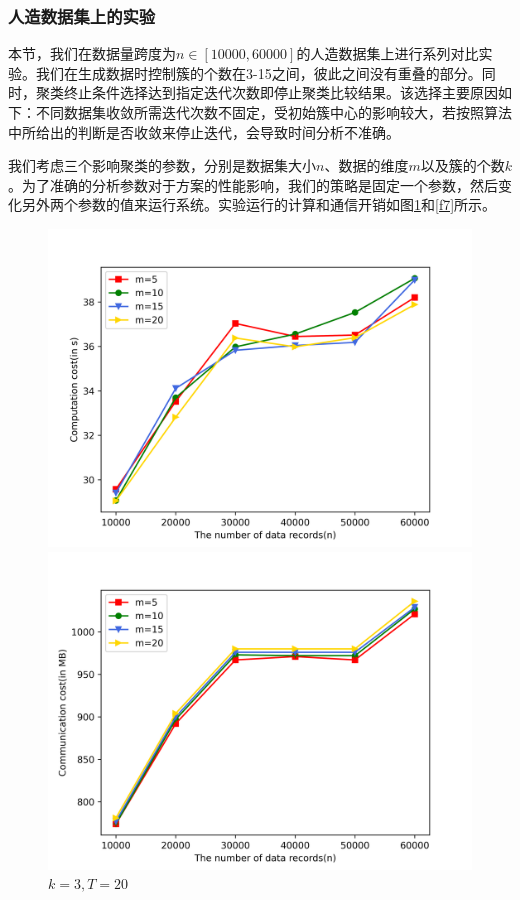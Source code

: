 \subsubsection{人造数据集上的实验}
本节，我们在数据量跨度为$ n\in[10000,60000] $的人造数据集上进行系列对比实验。我们在生成数据时控制簇的个数在3-15之间，彼此之间没有重叠的部分。同时，聚类终止条件选择达到指定迭代次数即停止聚类比较结果。该选择主要原因如下：不同数据集收敛所需迭代次数不固定，受初始簇中心的影响较大，若按照算法中所给出的判断是否收敛来停止迭代，会导致时间分析不准确。

我们考虑三个影响聚类的参数，分别是数据集大小$ n $、数据的维度$ m $以及簇的个数$ k $。为了准确的分析参数对于方案的性能影响，我们的策略是固定一个参数，然后变化另外两个参数的值来运行系统。实验运行的计算和通信开销如图\ref{f6}和\ref{f7}所示。
\begin{figure}[htbp] %
	\captionsetup{font=scriptsize}
	\begin{minipage}[t]{0.45\linewidth}
		\includegraphics[width=\linewidth]{img/m.png}
	\end{minipage}%
	\hfill%
	\begin{minipage}[t]{0.45\linewidth}
		\includegraphics[width=\linewidth]{img/m_comm.png}
	\end{minipage} 
	\caption{$k=3, T=20$}
	\label{f6}
\end{figure} 

